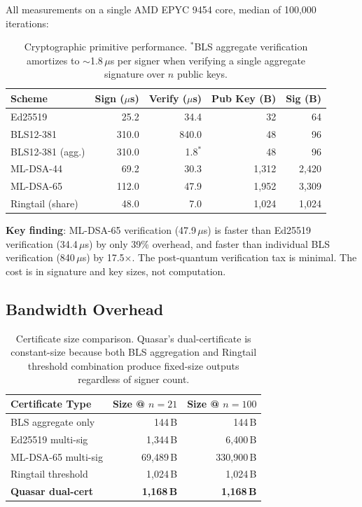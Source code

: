 \documentclass[11pt]{article}
\begin{document}
All measurements on a single AMD EPYC 9454 core, median of 100{,}000 iterations:

\begin{table}[h]
\centering
\small
\begin{tabular}{@{}lrrrr@{}}
\toprule
\textbf{Scheme} & \textbf{Sign ($\mu$s)} & \textbf{Verify ($\mu$s)} & \textbf{Pub Key (B)} & \textbf{Sig (B)} \\
\midrule
Ed25519            & 25.2   & 34.4  & 32      & 64 \\
BLS12-381          & 310.0  & 840.0 & 48      & 96 \\
BLS12-381 (agg.)   & 310.0  & 1.8$^*$   & 48  & 96 \\
ML-DSA-44          & 69.2   & 30.3  & 1{,}312 & 2{,}420 \\
ML-DSA-65          & 112.0  & 47.9  & 1{,}952 & 3{,}309 \\
Ringtail (share)   & 48.0   & 7.0   & 1{,}024 & 1{,}024 \\
\bottomrule
\end{tabular}
\caption{Cryptographic primitive performance. $^*$BLS aggregate verification amortizes
to $\sim$1.8\,$\mu$s per signer when verifying a single aggregate signature over $n$
public keys.}
\label{tab:crypto}
\end{table}

\textbf{Key finding}: ML-DSA-65 verification (47.9\,$\mu$s) is faster than Ed25519
verification (34.4\,$\mu$s) by only 39\% overhead, and faster than individual BLS
verification (840\,$\mu$s) by 17.5$\times$. The post-quantum verification tax is
minimal. The cost is in signature and key sizes, not computation.

\subsection{Bandwidth Overhead}

\begin{table}[h]
\centering
\begin{tabular}{@{}lrr@{}}
\toprule
\textbf{Certificate Type} & \textbf{Size @ $n=21$} & \textbf{Size @ $n=100$} \\
\midrule
BLS aggregate only         & 144\,B               & 144\,B \\
Ed25519 multi-sig          & 1{,}344\,B           & 6{,}400\,B \\
ML-DSA-65 multi-sig        & 69{,}489\,B          & 330{,}900\,B \\
Ringtail threshold         & 1{,}024\,B           & 1{,}024\,B \\
\textbf{Quasar dual-cert}  & \textbf{1{,}168\,B}  & \textbf{1{,}168\,B} \\
\bottomrule
\end{tabular}
\caption{Certificate size comparison. Quasar's dual-certificate is constant-size
because both BLS aggregation and Ringtail threshold combination produce fixed-size
outputs regardless of signer count.}
\label{tab:cert-size}
\end{table}
\end{document}
